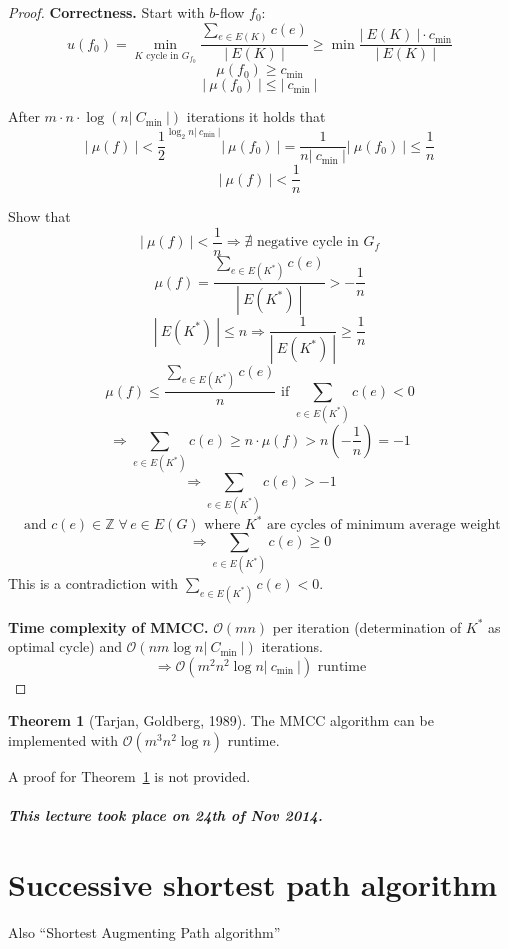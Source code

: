 \documentclass[a4paper]{article}
\theoremstyle{definition}
\newtheorem{theorem}{Theorem}
\newcommand{\card}[1]{\left|\:\!#1\:\!\right|}
\newcommand{\dateref}[1]{\paragraph{\textit{This lecture took place on #1.}}}
\newcommand{\fall}{\;\forall\,}
\newcommand{\noproof}[1]{A proof for Theorem~\ref{#1} is not provided.}
\begin{document}
\begin{proof}
  \textbf{Correctness.}
  Start with $b$-flow $f_0$:
  \[
    u(f_0) = \min_{K \text{ cycle in } G_{f_0}} \frac{\sum_{e \in E(K)} c(e)}{\card{E(K)}}
      \geq \min\frac{\card{E(K)} \cdot c_{\text{min}}}{\card{E(K)}}
  \] \[
    \mu(f_0) \geq c_{\text{min}}
  \] \[
    \card{\mu(f_0)} \leq \card{c_{\text{min}}}
  \]

  After $m\cdot n\cdot \log(n\card{C_{\text{min}}})$ iterations it holds that
  \[
    \card{\mu(f)}
      < {\frac12}^{\log_2{n\card{c_{\text{min}}}}} \card{\mu(f_0)}
      = \frac{1}{n\card{c_{\text{min}}}} \card{\mu(f_0)} \leq \frac1{n}
  \] \[
    \card{\mu(f)} < \frac1{n}
  \]

  Show that
  \[
    \card{\mu(f)} < \frac1{n} \Rightarrow \nexists \text{ negative cycle in } G_f
  \] \[
    \mu(f) = \frac{\sum_{e \in E(K^*)} c(e)}{\card{E(K^*)}} > -\frac1n
  \] \[
    \card{E(K^*)} \leq n \Rightarrow \frac{1}{\card{E(K^*)}} \geq \frac1n
  \] \[
    \mu(f) \leq \frac{\sum_{e \in E(K^*)} c(e)}{n}
      \text{ if } \sum_{e \in E(K^*)} c(e) < 0
  \] \[
    \Rightarrow \sum_{e \in E(K^*)} c(e)
      \geq n \cdot \mu(f)
      > n \left(-\frac1n\right) = -1
  \] \[
    \Rightarrow \sum_{e \in E(K^*)} c(e) > -1
  \] \[
    \text{ and } c(e) \in \mathbb{Z} \fall e \in E(G)
      \text{ where $K^*$ are cycles of minimum average weight}
  \] \[
    \Rightarrow \sum_{e \in E(K^*)} c(e) \geq 0
  \]
  This is a contradiction with $\sum_{e \in E(K^*)} c(e) < 0$.

  \textbf{Time complexity of MMCC.}
    $\mathcal{O}(mn)$ per iteration (determination of $K^*$ as optimal cycle)
    and $\mathcal{O}(nm\log{n} \card{C_{\text{min}}})$ iterations.
    \[ \Rightarrow \mathcal{O}(m^2 n^2 \log{n \card{c_{\text{min}}}}) \text{ runtime} \]
\end{proof}

\begin{theorem}[Tarjan, Goldberg, 1989]
  \label{satz-5.7}
  The MMCC algorithm can be implemented with $\mathcal{O}(m^3 n^2 \log{n})$ runtime.
\end{theorem}

\noproof{satz-5.7}

\dateref{24th of Nov 2014}

\section{Successive shortest path algorithm}
Also \enquote{Shortest Augmenting Path algorithm}
\end{document}
